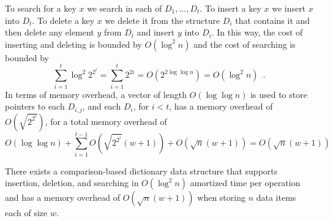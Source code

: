 To search for a key $x$ we search in each of $D_1,\ldots,D_t$.  To
insert a key $x$ we insert $x$ into $D_t$.  To delete a key $x$ we delete
it from the structure $D_i$ that contains it and then delete any element
$y$ from $D_t$ and insert $y$ into $D_i$.  In this way, the cost of
inserting and deleting is bounded by $O(\log^2 n)$ and the cost of
searching is bounded by
\[
   \sum_{i=1}^t \log^2 2^{2^i}
   = \sum_{i=1}^t {2^{2i}}
   = O(2^{2\log\log n})
   = O(\log^2 n) \enspace .
\]
In terms of memory overhead, a vector of length $O(\log\log n)$ is used to
store pointers to each $D_{i,j}$, and each $D_i$, for $i < t$, has a memory
overhead of $O(\sqrt{2^{2^i}})$, for a total memory overhead of
\[
  O(\log\log n) + \sum_{i=1}^{t-1}O(\sqrt{2^{2^i}}(w+1)) + O(\sqrt n(w+1))
  = O(\sqrt n(w+1))
\]

\begin{thm}
There exists a comparison-based dictionary data structure that supports
insertion, deletion, and searching in $O(\log^2 n)$ amortized time per
operation and has a memory overhead of $O(\sqrt{n}(w+1))$ when storing
$n$ data items each of size $w$.
\end{thm}

